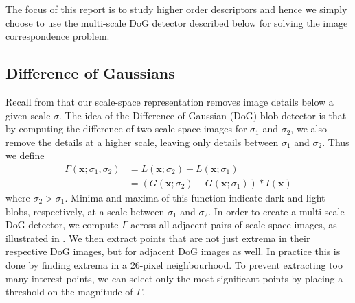 \documentclass[thesis.tex]{subfiles}
\def\x{\mathbf{x}}
\begin{document}
The focus of this report is to study higher order descriptors and hence we simply choose to use the multi-scale DoG detector described below for solving the image correspondence problem.

\subsection{Difference of Gaussians}

Recall from  that our scale-space representation removes image details below a given scale $\sigma$. The idea of the Difference of Gaussian (DoG) blob detector is that by computing the difference of two scale-space images for $\sigma_1$ and $\sigma_2$, we also remove the details at a higher scale, leaving only details between $\sigma_1$ and $\sigma_2$. Thus we define
%
\begin{align*}
\Gamma(\x;\sigma_1,\sigma_2) &= L(\x;\sigma_2) - L(\x;\sigma_1) \\
&= \left( G(\x;\sigma_2) - G(\x;\sigma_1) \right) \ast I(\x)
\end{align*}
%
where $\sigma_2 > \sigma_1$. Minima and maxima of this function indicate dark and light blobs, respectively, at a scale between $\sigma_1$ and $\sigma_2$. In order to create a multi-scale DoG detector, we compute $\Gamma$ across all adjacent pairs of scale-space images, as illustrated in . We then extract points that are not just extrema in their respective DoG images, but for adjacent DoG images as well. In practice this is done by finding extrema in a 26-pixel neighbourhood. To prevent extracting too many interest points, we can select only the most significant points by placing a threshold on the magnitude of $\Gamma$.
\end{document}
